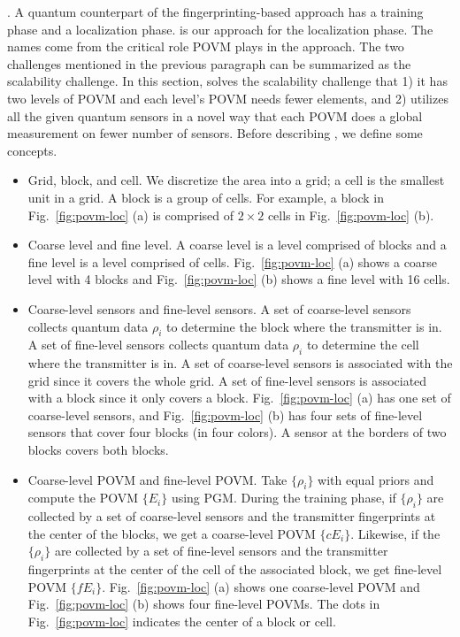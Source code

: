 . A quantum counterpart of the fingerprinting-based approach has a training phase and a localization phase.
\povm is our approach for the localization phase.
The names come from the critical role POVM plays in the approach.
The two challenges mentioned in the previous paragraph can be summarized as the scalability challenge.
In this section, \povm solves the scalability challenge that 1) it has two levels of POVM and each level's POVM needs fewer elements, and 2) utilizes all the given quantum sensors in a novel way that each POVM does a global measurement on fewer number of sensors.
Before describing \povm, we define some concepts.

\begin{itemize}
    \item Grid, block, and cell. We discretize the area into a grid; a cell is the smallest unit in a grid.
    A block is a group of cells. 
    For example, a block in Fig.~\ref{fig:povm-loc} (a) is comprised of $2 \times 2$ cells in  Fig.~\ref{fig:povm-loc} (b).
    
    \item Coarse level and fine level. A coarse level is a level comprised of blocks and a fine level is a level comprised of cells. 
    Fig.~\ref{fig:povm-loc} (a) shows a coarse level with 4 blocks and Fig.~\ref{fig:povm-loc} (b) shows a fine level with 16 cells.
    
    \item Coarse-level sensors and fine-level sensors. A set of coarse-level sensors collects quantum data $ \rho_i $ to determine the block where the transmitter is in. A set of fine-level sensors collects quantum data $ \rho_i$ to determine the cell where the transmitter is in. 
    A set of coarse-level sensors is associated with the grid since it covers the whole grid. A set of fine-level sensors is associated with a block since it only covers a block. 
    Fig.~\ref{fig:povm-loc} (a) has one set of coarse-level sensors, and Fig.~\ref{fig:povm-loc} (b) has four sets of fine-level sensors that cover four blocks (in four colors).
    A sensor at the borders of two blocks covers both blocks.
    
    \item Coarse-level POVM and fine-level POVM. Take $\{ \rho_i \}$ with equal priors and compute the POVM $\{ E_i \}$ using PGM. 
    During the training phase, if $\{ \rho_i \}$ are collected by a set of coarse-level sensors and the transmitter fingerprints at the center of the blocks, we get a coarse-level POVM $\{ cE_i \}$. 
    Likewise, if the  $\{ \rho_i \}$ are collected by a set of fine-level sensors and the transmitter fingerprints at the center of the cell of the associated block, we get fine-level POVM $\{ fE_i \}$.
    Fig.~\ref{fig:povm-loc} (a) shows one coarse-level POVM and Fig.~\ref{fig:povm-loc} (b) shows four fine-level POVMs.
    The dots in Fig.~\ref{fig:povm-loc} indicates the center of a block or cell.
\end{itemize}

